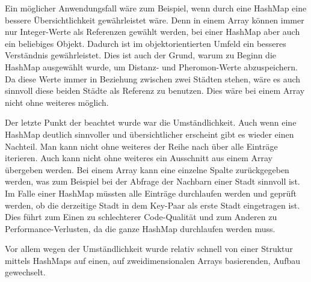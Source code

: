 Ein möglicher Anwendungsfall wäre zum Beispiel, wenn durch eine HashMap eine bessere Übersichtlichkeit gewährleistet wäre. Denn in einem Array können immer nur Integer-Werte als Referenzen gewählt werden, bei einer HashMap aber auch ein beliebiges Objekt. Dadurch ist im objektorientierten Umfeld ein besseres Verständnis gewährleistet. Dies ist auch der Grund, warum zu Beginn die HashMap ausgewählt wurde, um Distanz- und Pheromon-Werte abzuspeichern. Da diese Werte immer in Beziehung zwischen zwei Städten stehen, wäre es auch sinnvoll diese beiden Städte als Referenz zu benutzen. Dies wäre bei einem Array nicht ohne weiteres möglich.

Der letzte Punkt der beachtet wurde war die Umständlichkeit. Auch wenn eine HashMap deutlich sinnvoller und übersichtlicher erscheint gibt es wieder einen Nachteil. Man kann nicht ohne weiteres der Reihe nach über alle Einträge iterieren. Auch kann nicht ohne weiteres ein Ausschnitt aus einem Array übergeben werden. Bei einem Array kann eine einzelne Spalte zurückgegeben werden, was zum Beispiel bei der Abfrage der Nachbarn einer Stadt sinnvoll ist. Im Falle einer HashMap müssten alle Einträge durchlaufen werden und geprüft werden, ob die derzeitige Stadt in dem Key-Paar als erste Stadt eingetragen ist.
Dies führt zum Einen zu schlechterer Code-Qualität und zum Anderen zu Performance-Verlusten, da die ganze HashMap durchlaufen werden muss.

Vor allem wegen der Umständlichkeit wurde relativ schnell von einer Struktur mittels HashMaps auf einen, auf zweidimensionalen Arrays basierenden, Aufbau gewechselt.

